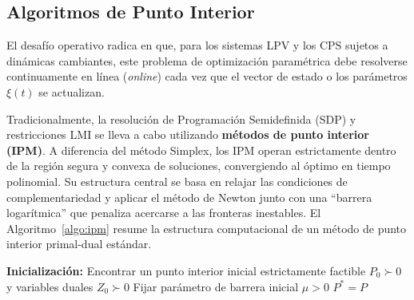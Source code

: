 \subsection{Algoritmos de Punto Interior}

El desafío operativo radica en que, para los sistemas LPV y los CPS sujetos a dinámicas cambiantes, este problema de optimización paramétrica debe resolverse continuamente en línea (\textit{online}) cada vez que el vector de estado o los parámetros $\xi(t)$ se actualizan. 

Tradicionalmente, la resolución de Programación Semidefinida (SDP) y restricciones LMI se lleva a cabo utilizando \textbf{métodos de punto interior (IPM)}. A diferencia del método Simplex, los IPM operan estrictamente dentro de la región segura y convexa de soluciones, convergiendo al óptimo en tiempo polinomial. Su estructura central se basa en relajar las condiciones de complementariedad y aplicar el método de Newton junto con una ``barrera logarítmica'' que penaliza acercarse a las fronteras inestables. El Algoritmo~\ref{algo:ipm} resume la estructura computacional de un método de punto interior primal-dual estándar.


\begin{algobox}
\begin{algorithm}[H]
    \SetAlgoLined
    \textbf{Inicialización:} Encontrar un punto interior inicial estrictamente factible $P_0 \succ 0$ y variables duales $Z_0 \succ 0$\;
    Fijar parámetro de barrera inicial $\mu > 0$\;
    \Return $P^* = P$\;
    \caption{Estructura Computacional de un Método de Punto Interior para LMIs}
    \label{algo:ipm}
\end{algorithm}
\end{algobox}

